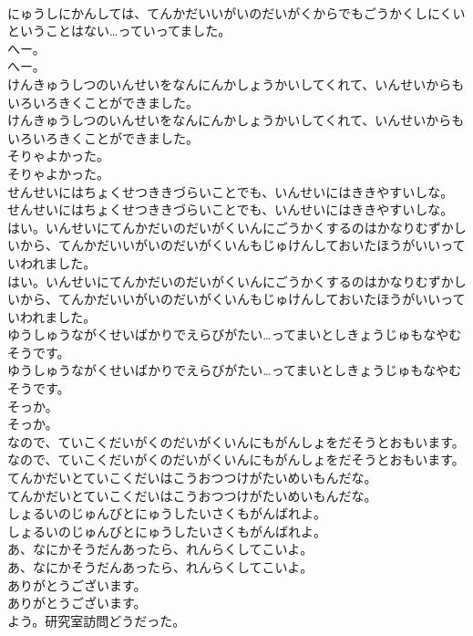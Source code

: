\documentclass[8pt]{extreport}
\begin{document}
\begin{CJK}{UTF8}{min}
\\	にゅうしにかんしては、てんかだいいがいのだいがくからでもごうかくしにくいということはない…っていってました。
\\	へー。
\\	へー。
\\	けんきゅうしつのいんせいをなんにんかしょうかいしてくれて、いんせいからもいろいろきくことができました。
\\	けんきゅうしつのいんせいをなんにんかしょうかいしてくれて、いんせいからもいろいろきくことができました。
\\	そりゃよかった。
\\	そりゃよかった。
\\	せんせいにはちょくせつききづらいことでも、いんせいにはききやすいしな。
\\	せんせいにはちょくせつききづらいことでも、いんせいにはききやすいしな。
\\	はい。いんせいにてんかだいのだいがくいんにごうかくするのはかなりむずかしいから、てんかだいいがいのだいがくいんもじゅけんしておいたほうがいいっていわれました。
\\	はい。いんせいにてんかだいのだいがくいんにごうかくするのはかなりむずかしいから、てんかだいいがいのだいがくいんもじゅけんしておいたほうがいいっていわれました。
\\	ゆうしゅうながくせいばかりでえらびがたい…ってまいとしきょうじゅもなやむそうです。
\\	ゆうしゅうながくせいばかりでえらびがたい…ってまいとしきょうじゅもなやむそうです。
\\	そっか。
\\	そっか。
\\	なので、ていこくだいがくのだいがくいんにもがんしょをだそうとおもいます。
\\	なので、ていこくだいがくのだいがくいんにもがんしょをだそうとおもいます。
\\	てんかだいとていこくだいはこうおつつけがたいめいもんだな。
\\	てんかだいとていこくだいはこうおつつけがたいめいもんだな。
\\	しょるいのじゅんびとにゅうしたいさくもがんばれよ。
\\	しょるいのじゅんびとにゅうしたいさくもがんばれよ。
\\	あ、なにかそうだんあったら、れんらくしてこいよ。
\\	あ、なにかそうだんあったら、れんらくしてこいよ。
\\	ありがとうございます。
\\	ありがとうございます。
\\	よう。研究室訪問どうだった。

\end{CJK}
\end{document}
